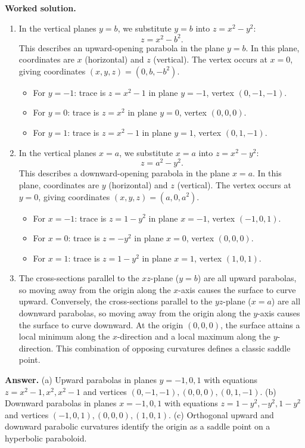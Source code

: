 \documentclass[11pt,letterpaper]{article}
\begin{document}
\textbf{Worked solution.}
\begin{enumerate}[label=(\alph*),leftmargin=*]
    \item In the vertical planes $y = b$, we substitute $y = b$ into $z = x^2 - y^2$:
    \[ z = x^2 - b^2. \]
    This describes an upward-opening parabola in the plane $y = b$. In this plane, coordinates are $x$ (horizontal) and $z$ (vertical). The vertex occurs at $x = 0$, giving coordinates $(x,y,z) = (0, b, -b^2)$.
    \begin{itemize}[nosep]
        \item For $y = -1$: trace is $z = x^2 - 1$ in plane $y = -1$, vertex $(0, -1, -1)$.
        \item For $y = 0$: trace is $z = x^2$ in plane $y = 0$, vertex $(0, 0, 0)$.
        \item For $y = 1$: trace is $z = x^2 - 1$ in plane $y = 1$, vertex $(0, 1, -1)$.
    \end{itemize}
    \item In the vertical planes $x = a$, we substitute $x = a$ into $z = x^2 - y^2$:
    \[ z = a^2 - y^2. \]
    This describes a downward-opening parabola in the plane $x = a$. In this plane, coordinates are $y$ (horizontal) and $z$ (vertical). The vertex occurs at $y = 0$, giving coordinates $(x,y,z) = (a, 0, a^2)$.
    \begin{itemize}[nosep]
        \item For $x = -1$: trace is $z = 1 - y^2$ in plane $x = -1$, vertex $(-1, 0, 1)$.
        \item For $x = 0$: trace is $z = -y^2$ in plane $x = 0$, vertex $(0, 0, 0)$.
        \item For $x = 1$: trace is $z = 1 - y^2$ in plane $x = 1$, vertex $(1, 0, 1)$.
    \end{itemize}
    \item The cross-sections parallel to the $xz$-plane ($y=b$) are all upward parabolas, so moving away from the origin along the $x$-axis causes the surface to curve upward. Conversely, the cross-sections parallel to the $yz$-plane ($x=a$) are all downward parabolas, so moving away from the origin along the $y$-axis causes the surface to curve downward. At the origin $(0,0,0)$, the surface attains a local minimum along the $x$-direction and a local maximum along the $y$-direction. This combination of opposing curvatures defines a classic saddle point.
\end{enumerate}

\textbf{Answer.}
(a) Upward parabolas in planes $y = -1, 0, 1$ with equations $z = x^2-1, x^2, x^2-1$ and vertices $(0,-1,-1), (0,0,0), (0,1,-1)$.
(b) Downward parabolas in planes $x = -1, 0, 1$ with equations $z = 1-y^2, -y^2, 1-y^2$ and vertices $(-1,0,1), (0,0,0), (1,0,1)$.
(c) Orthogonal upward and downward parabolic curvatures identify the origin as a saddle point on a hyperbolic paraboloid.
\end{document}
